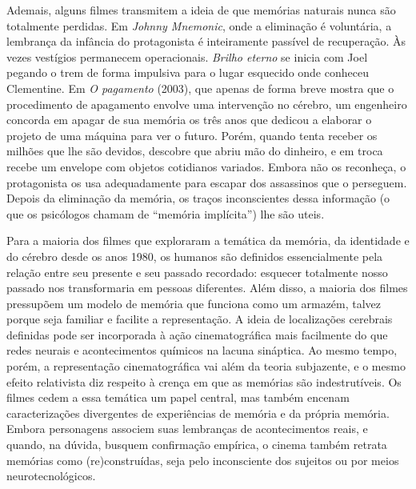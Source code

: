 Ademais, alguns filmes transmitem a ideia de que memórias naturais nunca
são totalmente perdidas. Em \emph{Johnny Mnemonic}, onde a eliminação é
voluntária, a lembrança da infância do protagonista é inteiramente
passível de recuperação. Às vezes vestígios permanecem operacionais.
\emph{Brilho eterno} se inicia com Joel pegando o trem de forma
impulsiva para o lugar esquecido onde conheceu Clementine. Em \emph{O
pagamento} (2003), que apenas de forma breve mostra que o procedimento
de apagamento envolve uma intervenção no cérebro, um engenheiro concorda
em apagar de sua memória os três anos que dedicou a elaborar o projeto
de uma máquina para ver o futuro. Porém, quando tenta receber os milhões
que lhe são devidos, descobre que abriu mão do dinheiro, e em troca
recebe um envelope com objetos cotidianos variados. Embora não os
reconheça, o protagonista os usa adequadamente para escapar dos
assassinos que o perseguem. Depois da eliminação da memória, os traços
inconscientes dessa informação (o que os psicólogos chamam de ``memória
implícita'') lhe são uteis.

Para a maioria dos filmes que exploraram a temática da memória, da
identidade e do cérebro desde os anos 1980, os humanos são definidos
essencialmente pela relação entre seu presente e seu passado recordado:
esquecer totalmente nosso passado nos transformaria em pessoas
diferentes. Além disso, a maioria dos filmes pressupõem um modelo de
memória que funciona como um armazém, talvez porque seja familiar e
facilite a representação. A ideia de localizações cerebrais definidas
pode ser incorporada à ação cinematográfica mais facilmente do que redes
neurais e acontecimentos químicos na lacuna sináptica. Ao mesmo tempo,
porém, a representação cinematográfica vai além da teoria subjazente, e
o mesmo efeito relativista diz respeito à crença em que as memórias são
indestrutíveis. Os filmes cedem a essa temática um papel central, mas
também encenam caracterizações divergentes de experiências de memória e
da própria memória. Embora personagens associem suas lembranças de
acontecimentos reais, e quando, na dúvida, busquem confirmação empírica,
o cinema também retrata memórias como (re)construídas, seja pelo
inconsciente dos sujeitos ou por meios neurotecnológicos.

